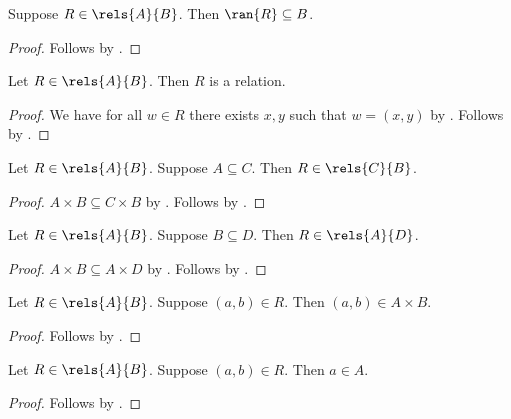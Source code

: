 \begin{proposition}\label{rels_ran_subseteq}
    Suppose $R\in\rels{A}{B}$.
    Then $\ran{R}\subseteq B$.
\end{proposition}
\begin{proof}
    Follows by .
\end{proof}

\begin{proposition}\label{rels_is_relation}
    Let $R\in\rels{A}{B}$.
    Then $R$ is a relation.
\end{proposition}
\begin{proof}
    We have for all $w\in R$ there exists $x, y$ such that $w = (x, y)$
        by .
    Follows by .
\end{proof}

\begin{proposition}\label{rels_weaken_dom}
    Let $R\in\rels{A}{B}$.
    Suppose $A\subseteq C$.
    Then $R\in\rels{C}{B}$.
\end{proposition}
\begin{proof}
    $A\times B\subseteq C\times B$ by .
    Follows by .
\end{proof}

\begin{proposition}\label{rels_weaken_codom}
    Let $R\in\rels{A}{B}$.
    Suppose $B\subseteq D$.
    Then $R\in\rels{A}{D}$.
\end{proposition}
\begin{proof}
    $A\times B\subseteq A\times D$ by .
    Follows by .
\end{proof}

\begin{proposition}\label{rels_type}
    Let $R\in\rels{A}{B}$.
    Suppose $(a,b)\in R$.
    Then $(a,b)\in A\times B$.
\end{proposition}
\begin{proof}
    Follows by .
\end{proof}

\begin{proposition}\label{rels_type_dom}
    Let $R\in\rels{A}{B}$.
    Suppose $(a,b)\in R$.
    Then $a\in A$.
\end{proposition}
\begin{proof}
    Follows by .
\end{proof}

